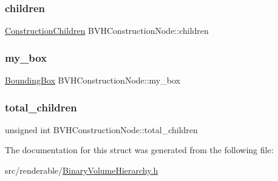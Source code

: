 \subsubsection{\texorpdfstring{children}{children}}
{\footnotesize\ttfamily \mbox{\hyperlink{unionBVHConstructionNode_1_1ConstructionChildren}{Construction\+Children}} B\+V\+H\+Construction\+Node\+::children}

\mbox{\label{structBVHConstructionNode_a7b016f9b43b10a37c6bbb546d8289c3e}} 
\subsubsection{\texorpdfstring{my\_box}{my\_box}}
{\footnotesize\ttfamily \mbox{\hyperlink{classBoundingBox}{Bounding\+Box}} B\+V\+H\+Construction\+Node\+::my\+\_\+box}

\mbox{\label{structBVHConstructionNode_a368f81cc16c426723f52ae5375362d54}} 
\subsubsection{\texorpdfstring{total\_children}{total\_children}}
{\footnotesize\ttfamily unsigned int B\+V\+H\+Construction\+Node\+::total\+\_\+children}



The documentation for this struct was generated from the following file\+:\begin{DoxyCompactItemize}
\item 
src/renderable/\mbox{\hyperlink{BinaryVolumeHierarchy_8h}{Binary\+Volume\+Hierarchy.\+h}}\end{DoxyCompactItemize}
